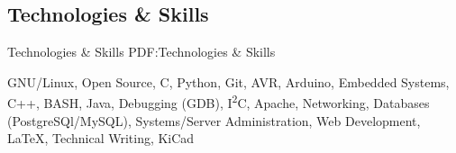 \documentclass[letterpaper,MMMyyyy,nonstop]{simpleresumecv}
\newcommand{\CVNote}{}
\begin{document}
\begin{body}
\fi


\section
{Technologies \& Skills}
{Technologies \& Skills}
{PDF:Technologies \& Skills }

GNU/Linux,
Open Source,
C,
Python,
Git,
AVR,
Arduino,
Embedded Systems,
C++,
BASH,
Java,
Debugging (GDB),
I\textsuperscript{2}C,
Apache,
Networking,
Databases (PostgreSQl/MySQL),
Systems/Server Administration,
Web Development,
{\LaTeX},
Technical Writing,
KiCad


\iffalse

\section
{References}
{References}
{PDF:References}

\Gap
\BulletItem
\textbf{Justin Dugger}
\newline
Senior Systems Architect
\newline
Oregon State University Open Source Lab
\newline
1800 SW Campus Way
224 Milne Computer Center
Corvallis, OR 97331
\newline
\href{mailto:jldugger@osuosl.org}
{jldugger@osuosl.org}
\,\SubBulletSymbol\,
+1\,(541)\,737-9900

\BigGap
\BulletItem
\textbf{Dave Corrigan}
\newline
Design Engineer
\newline
Digital Control Systems, Inc.
\newline
7401 SW Capitol Highway, 
Portland, Oregon 97219, USA
\newline
\href{mailto:dcorrigan@dcs-inc.net}
{dcorrigan@dcs-inc.net}
\,\SubBulletSymbol\,
+1\,(503)\,261-3336

\BigGap
\BulletItem
\textbf{Charlie Hyman}
\newline
Computer Science and Physics Teacher 
\newline
Wilsonville High School
\newline
6800 SW Wilsonville Rd, 
Wilsonville, Oregon 97070, USA
\newline
\href{mailto:HymanC@wlwv.k12.or.us}
{HymanC@wlwv.k12.or.us}
\,\SubBulletSymbol\,
+1\,(503)\,673-7615 + ext 4694

\fi

\end{body}


\iffalse

\UseNoteFont%
\null\hfill%
[\textit{\CVNote}]%
\hspace{2.0mm}\null

\fi
\end{document}
